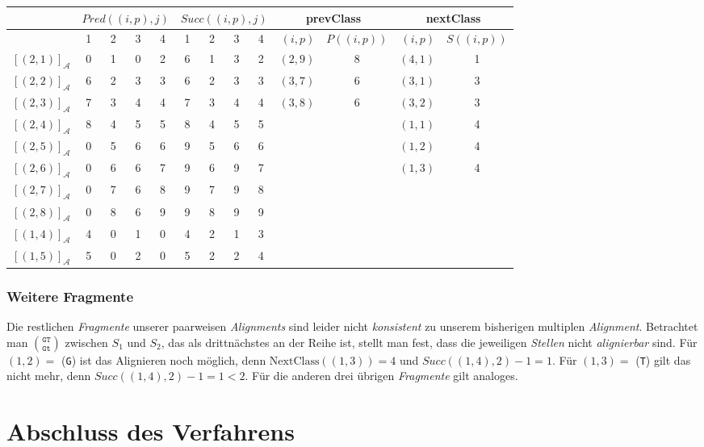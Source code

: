 \begin{tabular}{r|cccc|cccc||r|c|r|c}
	& \multicolumn{4}{c|}{$Pred((i,p),j)$} & \multicolumn{4}{c||}{$Succ((i,p),j)$} & \multicolumn{2}{c|}{\textrm{prevClass}} & \multicolumn{2}{c}{\textrm{nextClass}} \\ \hline
	\diagbox[dir=NW]{$(i,p)$}{$j$} & 1 & 2 & 3 & 4 & 1 & 2 & 3 & 4 & $(i,p)$ & $P((i,p))$ & $(i,p)$ & $S((i,p))$ \\ \hline
	$[(2,1)]_{\mathcal{A}}$ & 0 & 1 & 0 & 2 & 6 & 1 & 3 & 2 & $(2,9)$ & 8 & $(4,1)$ & 1 \\
	$[(2,2)]_{\mathcal{A}}$ & 6 & 2 & 3 & 3 & 6 & 2 & 3 & 3 & $(3,7)$ & 6 & $(3,1)$ & 3 \\
	$[(2,3)]_{\mathcal{A}}$ & 7 & 3 & 4 & 4 & 7 & 3 & 4 & 4 & $(3,8)$ & 6 & $(3,2)$ & 3 \\
	$[(2,4)]_{\mathcal{A}}$ & 8 & 4 & 5 & 5 & 8 & 4 & 5 & 5 & & & $(1,1)$ & 4 \\
	$[(2,5)]_{\mathcal{A}}$ & 0 & 5 & 6 & 6 & 9 & 5 & 6 & 6 & & & $(1,2)$ & 4 \\
	$[(2,6)]_{\mathcal{A}}$ & 0 & 6 & 6 & 7 & 9 & 6 & 9 & 7 & & & $(1,3)$ & 4 \\
	$[(2,7)]_{\mathcal{A}}$ & 0 & 7 & 6 & 8 & 9 & 7 & 9 & 8 & & & & \\
	$[(2,8)]_{\mathcal{A}}$ & 0 & 8 & 6 & 9 & 9 & 8 & 9 & 9 & & & & \\
	$[(1,4)]_{\mathcal{A}}$ & 4 & 0 & 1 & 0 & 4 & 2 & 1 & 3 & & & & \\
	$[(1,5)]_{\mathcal{A}}$ & 5 & 0 & 2 & 0 & 5 & 2 & 2 & 4 & & & & 
\end{tabular}
\normalsize

\subsubsection{Weitere Fragmente}

Die restlichen \emph{Fragmente} unserer paarweisen \emph{Alignments} sind leider nicht \emph{konsistent} zu unserem bisherigen multiplen \emph{Alignment}. Betrachtet man ${\texttt{GT}}\choose{\texttt{Gt}}$ zwischen $S_1$ und $S_2$, das als drittnächstes an der Reihe ist, stellt man fest, dass die jeweiligen \emph{Stellen} nicht \emph{alignierbar} sind. Für $(1,2) =$ (\texttt{G}) ist das Alignieren noch möglich, denn $\textrm{NextClass}((1,3)) = 4$ und $Succ((1,4),2) - 1 = 1$. Für $(1,3) =$ (\texttt{T}) gilt das nicht mehr, denn $Succ((1,4),2) - 1 = 1 < 2$. Für die anderen drei übrigen \emph{Fragmente} gilt analoges.

\section{Abschluss des Verfahrens}

